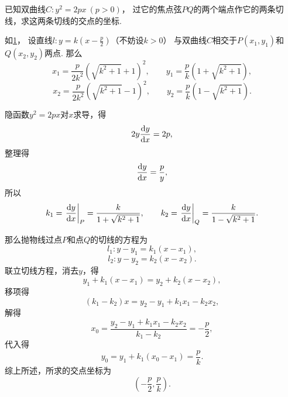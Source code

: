 \begin{example}
已知双曲线\(C: y^2 = 2px\ (p>0)\)，
过它的焦点弦\(PQ\)的两个端点作它的两条切线，求这两条切线的交点的坐标.
\begin{solution}
如\cref{figure:导数与微分.抛物线[y^2=2px]的焦点弦与切线}，
设直线\(l: y=k\left(x-\frac{p}{2}\right)\)（不妨设\(k>0\)）
与双曲线\(C\)相交于\(P(x_1,y_1)\)和\(Q(x_2,y_2)\)两点.
那么\[
	x_1 = \frac{p}{2 k^2} (\sqrt{k^2+1} + 1)^2,
	\qquad
	y_1 = \frac{p}{k} (1+\sqrt{k^2+1}),
\]\[
	x_2 = \frac{p}{2 k^2} (\sqrt{k^2+1} - 1)^2,
	\qquad
	y_2 = \frac{p}{k} (1-\sqrt{k^2+1}).
\]

隐函数\(y^2 = 2px\)对\(x\)求导，得\[
	2 y \dv{y}{x} = 2 p,
\]
整理得\[
	\dv{y}{x} = \frac{p}{y},
\]
所以\[
	k_1 = \eval{\dv{y}{x}}_P
	= \frac{k}{1+\sqrt{k^2+1}},
	\qquad
	k_2 = \eval{\dv{y}{x}}_Q
	= \frac{k}{1-\sqrt{k^2+1}}.
\]

那么抛物线过点\(P\)和点\(Q\)的切线的方程为\[
	l_1: y-y_1 = k_1 (x-x_1),
\]\[
	l_2: y-y_2 = k_2 (x-x_2).
\]
联立切线方程，消去\(y\)，得\[
	y_1 + k_1(x - x_1) = y_2 + k_2(x - x_2),
\]
移项得\[
	(k_1 - k_2) x = y_2 - y_1 + k_1 x_1 - k_2 x_2,
\]
解得\[
	x_0 = \frac{y_2 - y_1 + k_1 x_1 - k_2 x_2}{k_1 - k_2}
	= -\frac{p}{2},
\]
代入得\[
	y_0 = y_1 + k_1(x_0 - x_1)
	= \frac{p}{k}.
\]
综上所述，所求的交点坐标为\[
	\left(-\frac{p}{2},\frac{p}{k}\right).
\]
\end{solution}
\end{example}
\begin{figure}[htb]
	\centering
	\pgfmathsetmacro{\b}{\p/\k}
	\pgfmathsetmacro{\sb}{\p/\k}%
	\caption{}
	\label{figure:导数与微分.抛物线[y^2=2px]的焦点弦与切线}
\end{figure}

